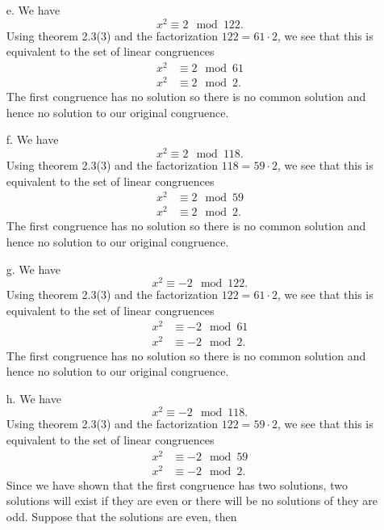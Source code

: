 \documentclass[12 pt]{amsart}
\begin{document}
\begin{enumerate}
    \item[e.]
      We have 
      \[
        x^2 \equiv 2 \mod 122.
      \]
      Using theorem 2.3(3) and the factorization 
      $122 = 61 \cdot 2$, we see that this is equivalent to the
      set of linear congruences
      \begin{align*}
        x^2 &\equiv 2 \mod 61 \\
        x^2 &\equiv 2 \mod 2.
      \end{align*}
      The first congruence has no solution so there is no common
      solution and hence no solution to our original congruence.
   \item[f.]
      We have 
      \[
        x^2 \equiv 2 \mod 118.
      \]
      Using theorem 2.3(3) and the factorization 
      $118 = 59 \cdot 2$, we see that this is equivalent to the
      set of linear congruences
      \begin{align*}
        x^2 &\equiv 2 \mod 59 \\
        x^2 &\equiv 2 \mod 2.
      \end{align*}
      The first congruence has no solution so there is no common
      solution and hence no solution to our original congruence.
   \item[g.]
      We have 
      \[
        x^2 \equiv -2 \mod 122.
      \]
      Using theorem 2.3(3) and the factorization 
      $122 = 61 \cdot 2$, we see that this is equivalent to the
      set of linear congruences
      \begin{align*}
        x^2 &\equiv -2 \mod 61 \\
        x^2 &\equiv -2 \mod 2.
      \end{align*}
      The first congruence has no solution so there is no common
      solution and hence no solution to our original congruence.
   \item[h.]
      We have 
      \[
        x^2 \equiv -2 \mod 118.
      \]
      Using theorem 2.3(3) and the factorization 
      $122 = 59 \cdot 2$, we see that this is equivalent to the
      set of linear congruences
      \begin{align*}
        x^2 &\equiv -2 \mod 59 \\
        x^2 &\equiv -2 \mod 2.
      \end{align*}
      Since we have shown that the first congruence has two solutions,
      two solutions will exist if they are even or there will be 
      no solutions of they are odd. 
      Suppose that the solutions are even, then 
      \begin{align*}

\end{align*}
\end{enumerate}
\end{document}
